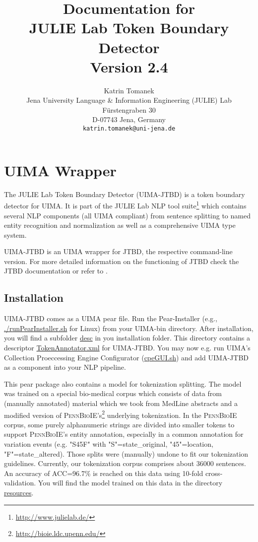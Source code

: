 \documentclass[11pt,a4paper,halfparskip]{scrartcl}
\title{\small{Documentation for}\\\huge JULIE Lab Token Boundary Detector\\\vspace{3mm}\small{Version 2.4}}
\author{\normalsize Katrin Tomanek\\
  \normalsize  Jena University Language \& Information Engineering (JULIE) Lab\\
  \normalsize F\"urstengraben 30 \\
  \normalsize D-07743 Jena, Germany\\
  {\normalsize \tt katrin.tomanek@uni-jena.de} }
\date{}
\begin{document}
\maketitle

\section{UIMA Wrapper}

The JULIE Lab Token Boundary Detector (UIMA-JTBD) is a token boundary
detector for UIMA.  It is part of the JULIE Lab NLP tool
suite\footnote{\url{http://www.julielab.de/}} which contains several
NLP components (all UIMA compliant) from sentence splitting to named
entity recognition and normalization as well as a comprehensive UIMA
type system.

UIMA-JTBD is an UIMA wrapper for JTBD, the respective command-line
version. For more detailed information on the functioning of JTBD
check the JTBD documentation or refer to \cite{Tomanek2007a}.

\subsection{Installation}

UIMA-JTBD comes as a UIMA pear file. Run the Pear-Installer (e.g.,
\url{./runPearInstaller.sh} for Linux) from your UIMA-bin directory.
After installation, you will find a subfolder \url{desc} in you
installation folder. This directory contains a descriptor
\url{TokenAnnotator.xml} for UIMA-JTBD. You may now e.g. run UIMA's
Collection Proeccessing Engine Configurator (\url{cpeGUI.sh}) and add
UIMA-JTBD as a component into your NLP pipeline.

This pear package also contains a model for tokenization splitting. The
model was trained on a special bio-medical corpus which consists of
data from (manually annotated) material which we took from MedLine
abstracts and a modified version of
\textsc{PennBioIE}'s\footnote{\url{http://bioie.ldc.upenn.edu/}}
underlying tokenization. In the \textsc{PennBioIE} corpus, some purely
alphanumeric strings are divided into smaller tokens to support
\textsc{PennBioIE}'s entity annotation, especially in a common
annotation for variation events (e.g.  "S45F" with
"S"=state\_original, "45"=location, "F"=state\_altered).  Those splits
were (manually) undone to fit our tokenization guidelines.  Currently,
our tokenization corpus comprises about 36000 sentences.  An accuracy
of ACC=96.7\% is reached on this data using 10-fold cross-validation.
You will find the model trained on this data in the directory
\url{resources}.
\end{document}

